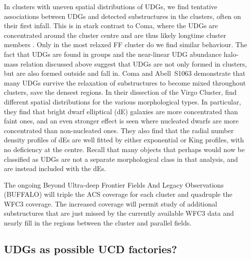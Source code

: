 \documentclass[iop,tighten,twocolumn,apj,floatfix]{emulateapj}
\begin{document}
In clusters with uneven spatial distributions of UDGs, we find
tentative associations between UDGs and detected substructures in
the clusters, often on their first infall.
This is in stark contrast to Coma, where the UDGs are concentrated around the cluster centre
and are thus likely longtime cluster members \citep{koda2015}.
Only in the most relaxed FF cluster do we find similar behaviour.
The fact that UDGs are found in groups and the near-linear UDG abundance
halo-mass relation discussed above suggest that UDGs are not only formed in clusters, but
are also formed outside and fall in.
Coma and Abell~S1063 demonstrate that many UDGs survive the
relaxation of substructures to become mixed throughout clusters, save the densest regions.
In their dissection of the Virgo Cluster, \cite{vcc6} find different spatial
distributions for the various morphological types.
In particular, they find that bright dwarf elliptical (dE) galaxies are more
concentrated than faint ones, and an even stronger effect is seen where
nucleated dwarfs are more concentrated than non-nucleated ones.
They also find that the radial number density profiles of dEs are well fitted
by either exponential or King profiles, with no deficiency at the centre.
Recall that many objects that perhaps would now be classified as UDGs are not a
separate morphological class in that analysis, and are instead included with
the dEs.

The ongoing Beyond Ultra-deep Frontier Fields And Legacy Observations
(BUFFALO) will triple the ACS coverage for each cluster and quadruple the WFC3
coverage.
The increased coverage will permit study of additional substructures that are just
missed by the currently available WFC3 data and nearly fill in the regions between
the cluster and parallel fields.

\subsection{UDGs as possible UCD factories?}
\end{document}
